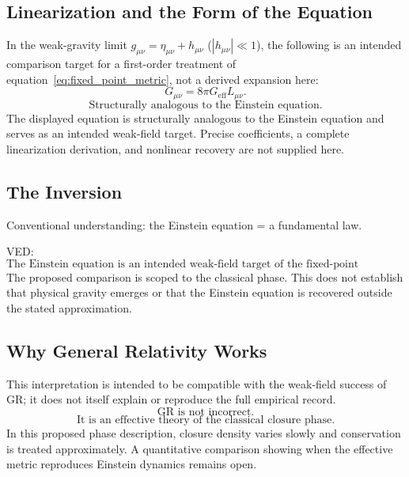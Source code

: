 \subsection{Linearization and the Form of the Equation}

In the weak-gravity limit $g_{\mu\nu} = \eta_{\mu\nu} + h_{\mu\nu}$
($|h_{\mu\nu}| \ll 1$),
the following is an intended comparison target for a first-order treatment of
equation~\eqref{eq:fixed_point_metric}, not a derived expansion here:
\begin{equation}
  \label{eq:einstein_analog}
  \boxed{G_{\mu\nu} = 8\pi G_{\text{eff}} L_{\mu\nu}.}
\end{equation}
\begin{equation}
  \boxed{\text{Structurally analogous to the Einstein equation.}}
\end{equation}
The displayed equation is structurally analogous to the Einstein equation and
serves as an intended weak-field target.  Precise coefficients, a complete
linearization derivation, and nonlinear recovery are not supplied here.

\subsection{The Inversion}

Conventional understanding: the Einstein equation = a fundamental law.

VED:
\begin{equation}
  \boxed{
    \text{The Einstein equation is an intended weak-field target of the fixed-point structure.}
  }
\end{equation}
The proposed comparison is scoped to the classical phase.  This does not
establish that physical gravity emerges or that the Einstein equation is
recovered outside the stated approximation.

\subsection{Why General Relativity Works}

This interpretation is intended to be compatible with the weak-field success
of GR; it does not itself explain or reproduce the full empirical record.
\begin{equation}
  \boxed{\text{GR is not incorrect.}}
\end{equation}
\begin{equation}
  \boxed{\text{It is an effective theory of the classical closure phase.}}
\end{equation}
In this proposed phase description, closure density varies slowly and
conservation is treated approximately.  A quantitative comparison showing
when the effective metric reproduces Einstein dynamics remains open.
